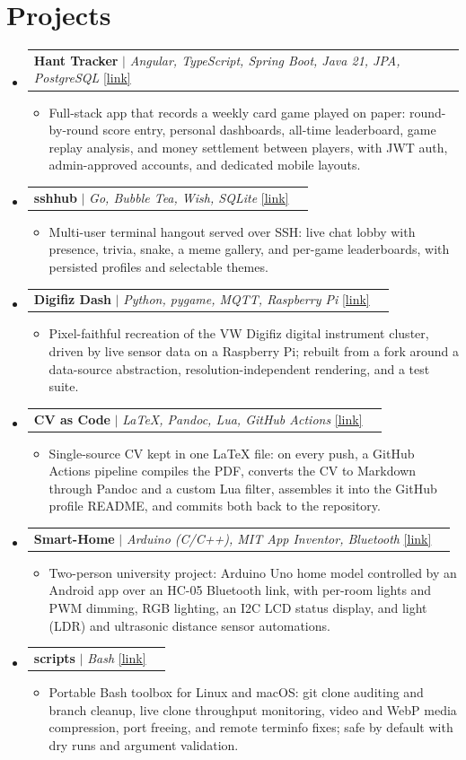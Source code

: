 \documentclass[letterpaper,11pt]{article}
\makeatletter
\newcommand{\resumeItem}[1]{
  \item\small{
    {#1 \vspace{-2pt}}
  }
}
\newcommand{\resumeProjectHeading}[2]{
    \item
    \begin{tabular*}{0.97\textwidth}{l@{\extracolsep{\fill}}r}
      \small#1 & #2 \\
    \end{tabular*}\vspace{-7pt}
}
\newcommand{\resumeSubHeadingListStart}{\begin{itemize}[leftmargin=0.15in, label={}]}
\newcommand{\resumeSubHeadingListEnd}{\end{itemize}}
\newcommand{\resumeItemListStart}{\begin{itemize}[leftmargin=0.2in, itemsep=1pt]}
\newcommand{\resumeItemListEnd}{\end{itemize}\vspace{-5pt}}
\makeatother
\begin{document}
\section{Projects}
    \resumeSubHeadingListStart
      \resumeProjectHeading
          {\textbf{Hant Tracker} $|$ \emph{Angular, TypeScript, Spring Boot, Java 21, JPA, PostgreSQL} \href{https://github.com/Dimitry4Now/hant-tracker}{[link]}}{}
          \resumeItemListStart
            \resumeItem{Full-stack app that records a weekly card game played on paper: round-by-round score entry, personal dashboards, all-time leaderboard, game replay analysis, and money settlement between players, with JWT auth, admin-approved accounts, and dedicated mobile layouts.}
          \resumeItemListEnd
      \resumeProjectHeading
          {\textbf{sshhub} $|$ \emph{Go, Bubble Tea, Wish, SQLite} \href{https://github.com/Dimitry4Now/sshhub}{[link]}}{}
          \resumeItemListStart
            \resumeItem{Multi-user terminal hangout served over SSH: live chat lobby with presence, trivia, snake, a meme gallery, and per-game leaderboards, with persisted profiles and selectable themes.}
          \resumeItemListEnd
      \resumeProjectHeading
          {\textbf{Digifiz Dash} $|$ \emph{Python, pygame, MQTT, Raspberry Pi} \href{https://github.com/Dimitry4Now/DIGIFIZ}{[link]}}{}
          \resumeItemListStart
            \resumeItem{Pixel-faithful recreation of the VW Digifiz digital instrument cluster, driven by live sensor data on a Raspberry Pi; rebuilt from a fork around a data-source abstraction, resolution-independent rendering, and a test suite.}
          \resumeItemListEnd
      \resumeProjectHeading
          {\textbf{CV as Code} $|$ \emph{LaTeX, Pandoc, Lua, GitHub Actions} \href{https://github.com/Dimitry4Now/Dimitry4Now}{[link]}}{}
          \resumeItemListStart
            \resumeItem{Single-source CV kept in one LaTeX file: on every push, a GitHub Actions pipeline compiles the PDF, converts the CV to Markdown through Pandoc and a custom Lua filter, assembles it into the GitHub profile README, and commits both back to the repository.}
          \resumeItemListEnd
      \resumeProjectHeading
          {\textbf{Smart-Home} $|$ \emph{Arduino (C/C++), MIT App Inventor, Bluetooth} \href{https://github.com/Dimitry4Now/Smart-Home}{[link]}}{}
          \resumeItemListStart
            \resumeItem{Two-person university project: Arduino Uno home model controlled by an Android app over an HC-05 Bluetooth link, with per-room lights and PWM dimming, RGB lighting, an I2C LCD status display, and light (LDR) and ultrasonic distance sensor automations.}
          \resumeItemListEnd
      \resumeProjectHeading
          {\textbf{scripts} $|$ \emph{Bash} \href{https://github.com/Dimitry4Now/scripts}{[link]}}{}
          \resumeItemListStart
            \resumeItem{Portable Bash toolbox for Linux and macOS: git clone auditing and branch cleanup, live clone throughput monitoring, video and WebP media compression, port freeing, and remote terminfo fixes; safe by default with dry runs and argument validation.}
          \resumeItemListEnd
    \resumeSubHeadingListEnd
\end{document}
